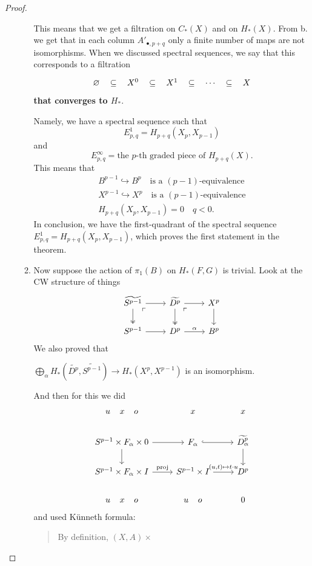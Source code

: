 \documentclass{article}
\begin{document}
\begin{proof}
\begin{enumerate}
\begin{enumerate}
			This means that we get a filtration on $C_*(X)$ and on $H_*(X)$. From b. we get that in each column $A'_{\bullet,p+q}$ only a finite number of maps are not isomorphisms. When we discussed spectral sequences, we say that this corresponds to a filtration
			\[\begin{tikzcd}
				\varnothing\arrow[r,phantom,"\subseteq"]&X^0\arrow[r,phantom,"\subseteq"]&X^1\arrow[r,phantom,"\subseteq"]&\cdots\arrow[r,phantom,"\subseteq"]&X
			\end{tikzcd}\]
			\textbf{that converges to $H_*$}.
			
			Namely, we have a spectral sequence such that
			\[E^1_{p,q}=H_{p+q}(X_p,X_{p-1})\]
			and
			\[E^\infty_{p,q}=\text{the }p\text{-th graded piece of }H_{p+q}(X).\]
			This means that
			\begin{align*}
				B^{p-1}\hookrightarrow B^p\quad\text{is a }(p-1)\text{-equivalence}\\
				X^{p-1}\hookrightarrow X^p\quad\text{is a }(p-1)\text{-equivalence}\\
				H_{p+q}(X_p,X_{p-1})=0\quad q<0.
			\end{align*}
			In conclusion, we have the first-quadrant of the spectral sequence $E^1_{p,q}=H_{p+q}(X_p,X_{p-1})$, which proves the first statement in the theorem.
			
			\item Now suppose the action of $\pi_1(B)$ on $H_*(F,G)$ is trivial. Look at the CW structure of things
			\[\begin{tikzcd}
				\widetilde{S^{p-1}}\arrow[d,two heads]\arrow[dr,phantom,very near start,"\ulcorner"]\arrow[r]&\widetilde{D^p}\arrow[r]\arrow[dr,phantom,very near start,"\ulcorner"]\arrow[d,two heads]&X^p\arrow[d]\\
				S^{p-1}\arrow[r]&D^p\arrow[r,"\alpha"]&B^p
			\end{tikzcd}\]
			We also proved that
			\begin{claim}
				$\bigoplus_\alpha H_*(\widetilde{D^p},\widetilde{S^{p-1}})\to H_*(X^p,X^{p-1})$ is an isomorphism.
			\end{claim}
			And then for this we did
			\[\begin{tikzcd}
				u\;\;\;\; x \;\;\;\;o&x&x\\
				S^{p-1}\times F_\alpha\times0\arrow[r]\arrow[d]&F_\alpha\arrow[r,hook]&\widetilde{D^p_\alpha}\arrow[d]\\
				S^{p-1}\times F_\alpha\times I\arrow[r,"\text{proj}"]&S^{p-1}\times I\arrow[r,"(u\text{,}t)\mapsto t\cdot u"]&D^p\\
				u\;\; \;\;x\;\;\;\; o&u\;\;\;\;o&0
			\end{tikzcd}\]
			and used Künneth formula:
		\begin{quotation}
			By definition, $(X,A)\times $
		\end{quotation}
		\end{enumerate}
		
	\end{enumerate}
\end{proof}
\end{document}
